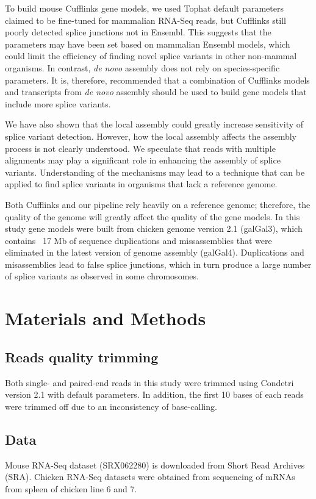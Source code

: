 To build mouse Cufflinks gene models, we used Tophat default parameters claimed
to be fine-tuned for mammalian RNA-Seq reads, but Cufflinks still poorly
detected splice junctions not in Ensembl.  This suggests that the parameters may
have been set based on mammalian Ensembl models, which could limit the
efficiency of finding novel splice variants in other non-mammal organisms.  In
contrast, {\em de novo} assembly does not rely on species-specific parameters.
It is, therefore, recommended that a combination of Cufflinks models and
transcripts from {\em de novo} assembly should be used to build gene models that
include more splice variants.

We have also shown that the local assembly could greatly increase sensitivity
of splice variant detection. However, how the local assembly affects the
assembly process is not clearly understood.  We speculate that reads with
multiple alignments may play a significant role in enhancing the assembly of
splice variants.  Understanding of the mechanisms may lead to a technique that
can be applied to find splice variants in organisms that lack a reference
genome.

Both Cufflinks and our pipeline rely heavily on a reference genome; therefore,
the quality of the genome will greatly affect the quality of the gene models.
In this study gene models were built from chicken genome version 2.1 (galGal3),
which contains ~17 Mb of sequence duplications and missassemblies
that were eliminated in the latest version of genome assembly
(galGal4).  Duplications and misassemblies lead to false splice junctions, which
in turn produce a large number of splice variants as observed in some
chromosomes.

\section{Materials and Methods}

\subsection{Reads quality trimming}
Both single- and paired-end reads in this study were trimmed using Condetri
version 2.1 with default parameters.  In addition, the first 10 bases of each
reads were trimmed off due to an inconsistency of base-calling.

\subsection{Data}
Mouse RNA-Seq dataset (SRX062280) is downloaded from Short Read Archives (SRA).
Chicken RNA-Seq datasets were obtained from sequencing of mRNAs from spleen of
chicken line 6 and 7.

